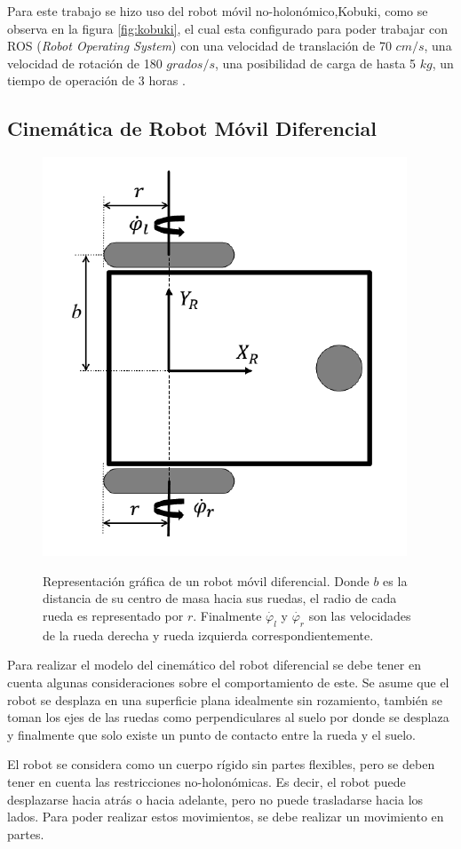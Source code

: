 Para este trabajo se hizo uso del robot m\'ovil no-holon\'omico,Kobuki, como 
se observa en la figura \ref{fig:kobuki}, el cual esta configurado para poder 
trabajar con ROS (\textit{Robot Operating System}) con una velocidad de 
translaci\'on de 70 $cm/s$, una velocidad de rotaci\'on de 180 $grados/s$, 
una posibilidad de carga de hasta 5 $kg$, un tiempo de operaci\'on de 3 
horas \cite{aboutKobuki}. 

\subsection{Cinem\'atica de Robot M\'ovil Diferencial}
\begin{figure}%
\centering \footnotesize
{\includegraphics[width=0.40\linewidth]{images/kinematic_model.png}}
\captionsetup{font=footnotesize}
\caption{Representaci\'on gr\'afica de un robot m\'ovil diferencial. Donde 
$b$ es la distancia de su centro de masa hacia sus ruedas, el radio de cada 
rueda es representado por $r$. Finalmente $\dot{\varphi_{l}}$ y 
$\dot{\varphi_{r}}$ son las velocidades de la rueda derecha y rueda izquierda 
correspondientemente.}
\label{fig:RMkinematic}
\end{figure}
Para realizar el modelo del cinem\'atico del robot diferencial se debe tener 
en cuenta algunas consideraciones sobre el comportamiento de este. Se asume 
que el robot se desplaza en una superficie plana idealmente sin rozamiento, 
tambi\'en se toman los ejes de las ruedas como perpendiculares al suelo
por donde se desplaza y finalmente que solo existe un punto de contacto entre 
la rueda y el suelo.

El robot se considera como un cuerpo r\'igido sin partes flexibles, pero se 
deben tener en cuenta las restricciones no-holon\'omicas. Es decir, el robot 
puede desplazarse hacia atr\'as o hacia adelante, pero no puede trasladarse 
hacia los lados. Para poder realizar estos movimientos, se debe realizar un 
movimiento en partes.

